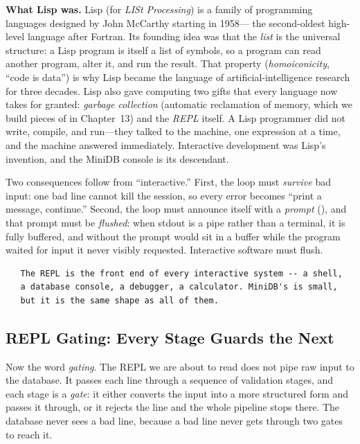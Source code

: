 \textbf{What Lisp was.} Lisp (for \emph{LISt Processing}) is a family
of programming languages designed by John McCarthy starting in 1958---
the second-oldest high-level language after Fortran. Its founding idea
was that the \emph{list} is the universal structure: a Lisp program is
itself a list of symbols, so a program can read another program, alter
it, and run the result. That property (\emph{homoiconicity}, ``code is
data'') is why Lisp became the language of artificial-intelligence
research for three decades. Lisp also gave computing two gifts that
every language now takes for granted: \emph{garbage collection}
(automatic reclamation of memory, which we build pieces of in
Chapter~13) and the \emph{REPL} itself. A Lisp programmer did not
write, compile, and run---they talked to the machine, one expression
at a time, and the machine answered immediately. Interactive
development was Lisp's invention, and the MiniDB console is its
descendant.

Two consequences follow from ``interactive.'' First, the loop must
\emph{survive} bad input: one bad line cannot kill the session, so
every error becomes ``print a message, continue.'' Second, the loop
must announce itself with a \emph{prompt} (), and that
prompt must be \emph{flushed}: when stdout is a pipe rather than a
terminal, it is fully buffered, and without  the
prompt would sit in a buffer while the program waited for input it
never visibly requested. Interactive software must flush.

\begin{verbatim}
   The REPL is the front end of every interactive system -- a shell,
   a database console, a debugger, a calculator. MiniDB's is small,
   but it is the same shape as all of them.
\end{verbatim}

\subsection{REPL Gating: Every Stage Guards the Next}

Now the word \emph{gating}. The REPL we are about to read does not
pipe raw input to the database. It passes each line through a sequence
of validation stages, and each stage is a \emph{gate}: it either
converts the input into a more structured form and passes it through,
or it rejects the line and the whole pipeline stops there. The
database never sees a bad line, because a bad line never gets through
two gates to reach it.

